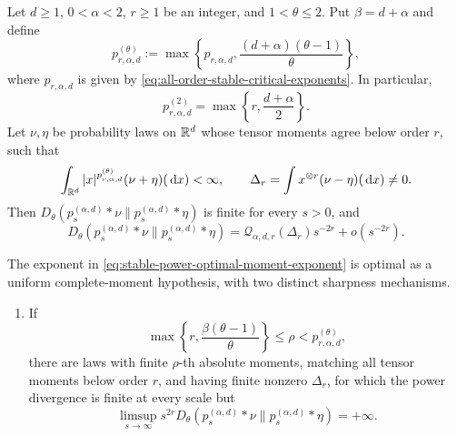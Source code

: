 \begin{theorem}
\label{thm:stable-power-divergence-moment-phase}
Let \(d\ge1\), \(0<\alpha<2\), \(r\ge1\) be an integer, and
\(1<\theta\le2\).  Put \(\beta=d+\alpha\) and define
\begin{equation}\label{eq:stable-power-optimal-moment-exponent}
 p_{r,\alpha,d}^{(\theta)}
 :=\max\left\{
 p_{r,\alpha,d},\frac{(d+\alpha)(\theta-1)}{\theta}
 \right\},
\end{equation}
where \(p_{r,\alpha,d}\) is given by
\eqref{eq:all-order-stable-critical-exponents}.  In particular,
\begin{equation}\label{eq:stable-chi-square-optimal-moment-exponent}
 p_{r,\alpha,d}^{(2)}
 =\max\left\{r,\frac{d+\alpha}{2}\right\}.
\end{equation}
Let \(\nu,\eta\) be
probability laws on \(\mathbb{R}^d\) whose tensor moments agree below order \(r\),
such that
\begin{equation}\label{eq:stable-power-moment-hypotheses}
 \int_{\mathbb{R}^d}|x|^{p_{r,\alpha,d}^{(\theta)}}
       (\nu+\eta)(\,\mathrm{d} x)<\infty,
 \qquad
 \Delta_r=\int x^{\otimes r}(\nu-\eta)(\,\mathrm{d} x)\ne0.
\end{equation}
Then \(D_\theta(p_s^{(\alpha,d)}*\nu\|
p_s^{(\alpha,d)}*\eta)\) is finite for every \(s>0\), and
\begin{equation}\label{eq:stable-power-first-unmatched-asymptotic}
 D_\theta(p_s^{(\alpha,d)}*\nu\|
          p_s^{(\alpha,d)}*\eta)
 =\mathcal Q_{\alpha,d,r}(\Delta_r)s^{-2r}+o(s^{-2r}).
\end{equation}

The exponent in \eqref{eq:stable-power-optimal-moment-exponent} is optimal
as a uniform complete-moment hypothesis, with two distinct sharpness
mechanisms.
\begin{enumerate}[label=\textup{(\roman*)}]
\item If
\[
 \max\left\{r,\frac{\beta(\theta-1)}\theta\right\}
 \le\rho<p_{r,\alpha,d}^{(\theta)},
\]
there are laws with finite \(\rho\)-th absolute moments, matching all
tensor moments below order \(r\), and having finite nonzero \(\Delta_r\),
for which the power divergence is finite at every scale but
\begin{equation}\label{eq:stable-power-analytic-sharpness}
 \limsup_{s\to\infty}s^{2r}
 D_\theta(p_s^{(\alpha,d)}*\nu\|
          p_s^{(\alpha,d)}*\eta)=+\infty.
\end{equation}


\end{enumerate}
\end{theorem}
